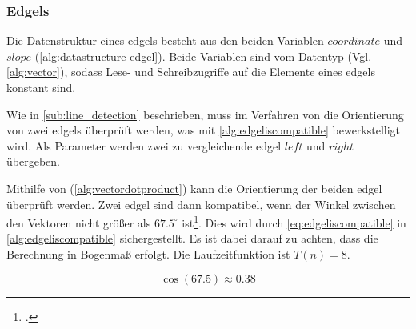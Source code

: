 \subsubsection{Edgels} %
\label{sub:datenstruktur-edgels}

Die Datenstruktur eines \glspl{edgel} besteht aus den beiden Variablen $\mathit{coordinate}$ und $\mathit{slope}$
 (\autoref{alg:datastructure-edgel}). Beide Variablen sind vom Datentyp  (Vgl.
 \autoref{alg:vector}), sodass Lese- und Schreibzugriffe auf die Elemente eines \glspl{edgel} konstant sind.


Wie in \autoref{sub:line_detection} beschrieben, muss im Verfahren von \citeauthor{hirzer08} die Orientierung von zwei
 \glspl{edgel} überprüft werden, was mit \autoref{alg:edgeliscompatible} bewerkstelligt wird. Als Parameter werden
 zwei zu vergleichende \gls{edgel} $\mathit{left}$ und $\mathit{right}$ übergeben.

Mithilfe von  (\autoref{alg:vectordotproduct}) kann die Orientierung der beiden \gls{edgel}
 überprüft werden. Zwei \gls{edgel} sind dann kompatibel, wenn der Winkel zwischen den Vektoren nicht größer als
 $67.5^\circ$ ist\footcite[Vgl.][S.~417]{clarke96}. Dies wird durch \autoref{eq:edgeliscompatible} in
 \autoref{alg:edgeliscompatible} sichergestellt. Es ist dabei darauf zu achten, dass die Berechnung in Bogenmaß
 erfolgt. Die Laufzeitfunktion ist $T(n) = 8$.

\begin{equation}
	\label{eq:edgeliscompatible}
	\cos \left(67.5\right) \approx 0.38
\end{equation}

